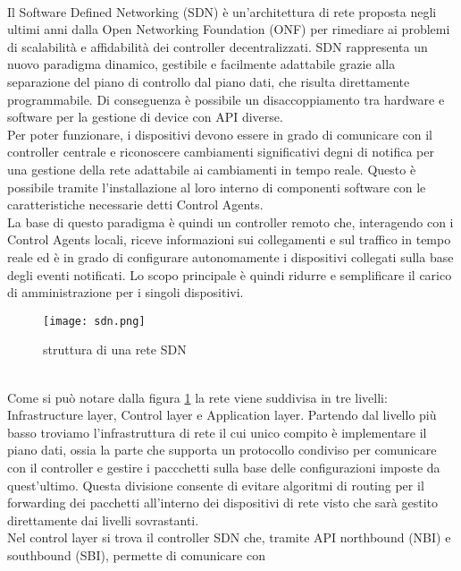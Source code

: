\\Il Software Defined Networking (SDN) è un'architettura di rete proposta negli ultimi anni dalla Open Networking Foundation (ONF) \cite{ONF} per rimediare ai problemi di scalabilità e affidabilità dei controller decentralizzati.
SDN rappresenta un nuovo paradigma dinamico, gestibile e facilmente adattabile grazie alla separazione del piano di controllo dal piano dati, che risulta direttamente programmabile. 
Di conseguenza è possibile un disaccoppiamento tra hardware e software per la gestione di device con API diverse.
\\Per poter funzionare, i dispositivi devono essere in grado di comunicare con il controller centrale e riconoscere cambiamenti significativi degni di notifica per una gestione della rete adattabile ai cambiamenti in tempo reale. 
Questo è possibile tramite l'installazione al loro interno di componenti software con le caratteristiche necessarie
detti Control Agents.
\\La base di questo paradigma è quindi un controller remoto che, interagendo con i Control Agents
locali, riceve informazioni sui collegamenti e sul traffico in tempo reale ed è in grado di
configurare autonomamente i dispositivi collegati sulla base degli eventi notificati. Lo scopo
principale è quindi ridurre e semplificare il carico di amministrazione per i singoli dispositivi.
\begin{figure}[h]
    \centering
   \texttt{[image: sdn.png]}
    \caption{struttura di una rete SDN}
    \label{fig:sdnF}
\end{figure}
\\Come si può notare dalla figura \ref{fig:sdnF} la rete viene suddivisa in tre livelli: Infrastructure layer, Control layer e Application layer.
Partendo dal livello più basso troviamo l'infrastruttura di rete il cui unico compito è implementare il piano dati, ossia la parte che supporta un protocollo condiviso per comunicare con il controller e gestire
i paccchetti sulla base delle configurazioni imposte da quest'ultimo. 
Questa divisione consente di evitare algoritmi
di routing per il forwarding dei pacchetti all'interno dei dispositivi di rete visto che sarà
gestito direttamente dai livelli sovrastanti. 
\\Nel control layer si trova il controller SDN che, tramite API northbound (NBI) e southbound (SBI), permette di comunicare con
